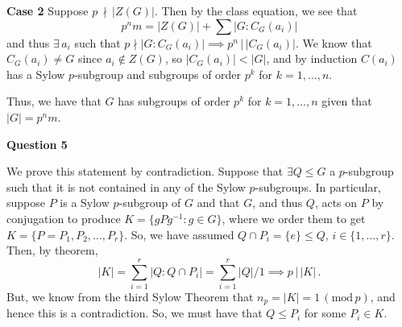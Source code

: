 \documentclass[10pt]{article}
\begin{document}
\textbf{Case 2} Suppose $p \, \nmid \, |Z(G)|$. Then by the class equation, we see that
\[ p^{n}m = |Z(G)| + \sum |G:C_{G}(a_{i})| \]
and thus $\exists \, a_{i}$ such that $p \nmid |G:C_{G}(a_{i})| \implies p^{n} \, | \, |C_{G}(a_{i})|$. We know that $C_{G}(a_{i}) \neq G$ since $a_{i} \notin Z(G)$, so $|C_{G}(a_{i})| < |G|$, and by induction $C(a_{i})$ has a Sylow $p$-subgroup and subgroups of order $p^{k}$ for $k = 1, \dots, n$.

Thus, we have that $G$ has subgroups of order $p^{k}$ for $k = 1, \dots, n$ given that $|G| = p^{n}m$.

\newpage
\textbf{Question 5}

We prove this statement by contradiction. Suppose that $\exists Q \leq G$ a $p$-subgroup such that it is not contained in any of the Sylow $p$-subgroups. In particular, suppose $P$ is a Sylow $p$-subgroup of $G$ and that $G$, and thus $Q$, acts on $P$ by conjugation to produce $K = \{gPg^{-1}: g\in G\}$, where we order them to get $K = \{P = P_{1}, P_{2}, \dots, P_{r}\}$. So, we have assumed $Q \cap P_{i} = \{e\} \leq Q$, $i\in \{1, \dots, r\}$. Then, by theorem,
\[ |K| = \sum_{i=1}^{r}|Q:Q\cap P_{i}| = \sum_{i=1}^{r}|Q|/1 \implies p\, |\, |K| \,.\]
But, we know from the third Sylow Theorem that $n_{p} = |K| = 1 \, (\text{mod} \, p )$, and hence this is a contradiction. So, we must have that $Q \leq P_{i}$ for some $P_{i} \in K$.
\end{document}
